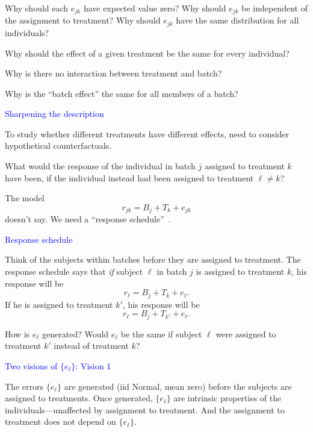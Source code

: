 \documentclass[landscape]{slides}
\newcommand{\beq}{\begin{equation}}
\newcommand{\eeq}{\end{equation}}
\begin{document}
\begin{slide}
\begin{slide}
Why should each $e_{jk}$ have expected value zero?  
Why should $e_{jk}$ be independent of the assignment to treatment?  
Why should $e_{jk}$ have the same distribution for all individuals?

Why should the effect of a given treatment be the same for every individual?

Why is there no interaction between treatment and batch?

Why is the ``batch effect'' the same for all members of a batch?

\end{slide}

\begin{slide}
{\textcolor{blue}{Sharpening the description}}

To study whether different treatments have different effects, need to consider
hypothetical counterfactuals.

What would the response of the individual in batch $j$ assigned to treatment 
$k$ have been, if the individual instead had been assigned to treatment $\ell \ne k$?

The model
\beq
     r_{jk} = B_j + T_k + e_{jk}
\eeq
doesn't say.  
We need a ``response schedule''~\cite{freedman09}.

\end{slide}

\begin{slide}
{\textcolor{blue}{Response schedule}}

Think of the subjects within batches before they are assigned to treatment.
The response schedule says that {\em if\/} subject $\ell$ in batch $j$
is assigned to treatment $k$, his response will be
\beq
     r_\ell = B_j + T_k + e_\ell.
\eeq
If he is assigned to treatment $k'$, his response will be
\beq
     r_\ell = B_j + T_{k'} + e_\ell.
\eeq

How is $e_\ell$ generated?  Would $e_\ell$ be the same if subject $\ell$
were assigned to treatment $k'$ instead of treatment $k$?

\end{slide}


\begin{slide}
{\textcolor{blue}{Two visions of $\{e_{\ell}\}$: Vision 1}}

The errors $\{ e_\ell \}$ are generated (iid Normal, mean zero) 
before the subjects are assigned to
treatments.
Once generated, $\{e_\ell\}$ are intrinsic properties of the individuals---unaffected
by assignment to treatment.
And the assignment to treatment does not depend on 
$\{e_\ell\}$.


\end{slide}
\end{slide}
\end{document}
